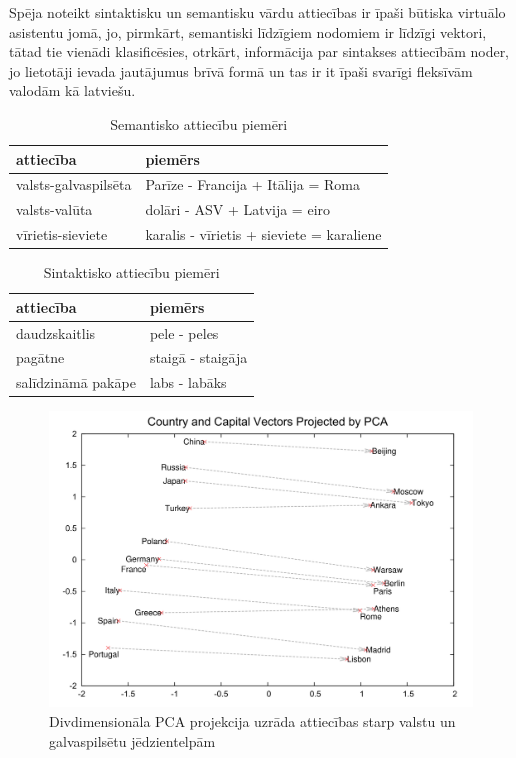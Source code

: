 Spēja noteikt sintaktisku un semantisku vārdu attiecības ir īpaši būtiska virtuālo asistentu jomā, jo, pirmkārt, semantiski līdzīgiem nodomiem ir līdzīgi vektori, tātad tie vienādi klasificēsies, otrkārt, informācija par sintakses attiecībām noder, jo lietotāji ievada jautājumus brīvā formā un tas ir it īpaši svarīgi fleksīvām valodām kā latviešu.



\begin{table}[htbp]
	\centering
	\caption{Semantisko attiecību piemēri}
	\begin{tabular}{ll}\toprule
		attiecība & piemērs  \\\midrule
		valsts-galvaspilsēta   & Parīze - Francija + Itālija = Roma \\
		valsts-valūta   & dolāri - ASV + Latvija = eiro \\
		vīrietis-sieviete   & karalis - vīrietis + sieviete = karaliene \\\bottomrule
	\end{tabular}%
	\label{tab:semantic-relationship-examples}%
\end{table}

\begin{table}[htbp]
	\centering
	\caption{Sintaktisko attiecību piemēri}
	\begin{tabular}{ll}\toprule
		attiecība & piemērs  \\\midrule
		daudzskaitlis   & pele - peles \\
		pagātne   & staigā - staigāja \\
		salīdzināmā pakāpe   & labs - labāks \\\bottomrule
	\end{tabular}%
	\label{tab:semantic-relationship-examples}%
\end{table}


\begin{figure}[h]
	\centering
	\includegraphics[width=\textwidth]{figures/word2vec-country-capital.png}
	\caption{Divdimensionāla PCA projekcija uzrāda attiecības starp valstu un galvaspilsētu jēdzientelpām}
\end{figure}

